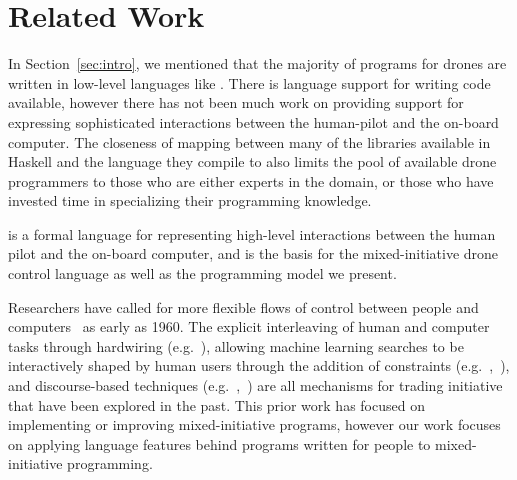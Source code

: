 \documentclass{sig-alternate-05-2015}
\begin{document}

\section{Related Work}
\label{sec:related}

%
In Section~\ref{sec:intro}, we mentioned that the majority of programs for
drones are written in low-level languages like . There is language
support for writing  code available, however there has not been
much work on providing support for expressing sophisticated interactions
between the human-pilot and the on-board computer. The closeness of mapping
between many of the libraries available in Haskell and the  language
they compile to also limits the pool of available drone programmers to those
who are either experts in the domain, or those who have invested time in
specializing their programming knowledge.

 is a formal language for
representing high-level interactions between the human pilot and the on-board
computer, and is the basis for the mixed-initiative drone control language as
well as the programming model we present.

Researchers have called for more flexible flows of control between people and
computers~\cite{L60symbiosis} as early as 1960. The explicit interleaving
of human and computer tasks through hardwiring (e.g.~\cite{LHML08cosripter}),
allowing machine learning searches to be interactively shaped by human users
through the addition of constraints
(e.g.~\cite{LMRS04symbiosis},~\cite{Kea11why}), and discourse-based techniques
(e.g.~\cite{SRL01collagen},~\cite{ML92explanatory}) are all mechanisms for
trading initiative that have been explored in the past. This prior work has
focused on implementing or improving mixed-initiative programs, however our
work focuses on applying language features behind programs written for people
to mixed-initiative programming.
\end{document}
